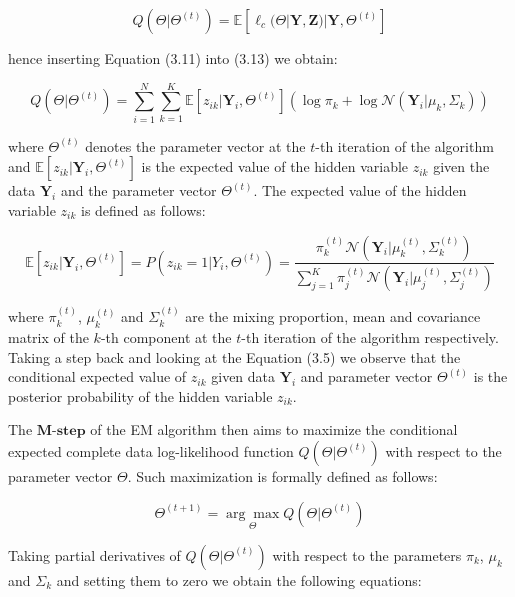 \begin{equation}
    Q(\Theta|\Theta^{(t)}) = \mathbb{E}[\ell_c(\Theta|\textbf{Y},\textbf{Z})|\textbf{Y},\Theta^{(t)}]
\end{equation}

hence inserting Equation (3.11) into (3.13) we obtain:

\begin{equation}
    Q(\Theta|\Theta^{(t)}) = \sum_{i=1}^{N} \sum_{k=1}^{K} \mathbb{E}[z_{ik}|\textbf{Y}_i,\Theta^{(t)}] \left(\log \pi_k + \log \mathcal{N}(\textbf{Y}_i|\mu_k,\Sigma_k)\right)
\end{equation}

where $\Theta^{(t)}$ denotes the parameter vector at the $t$-th iteration of the algorithm and $\mathbb{E}[z_{ik}|\textbf{Y}_i,\Theta^{(t)}]$ is the expected value of the hidden variable $z_{ik}$ given the data $\textbf{Y}_i$ and the parameter vector $\Theta^{(t)}$.
The expected value of the hidden variable $z_{ik}$ is defined as follows:

\begin{equation}
    \mathbb{E}[z_{ik}|\textbf{Y}_i,\Theta^{(t)}] = P(z_{ik} = 1|Y_i,\Theta^{(t)}) = \frac{\pi_k^{(t)} \mathcal{N}(\textbf{Y}_i|\mu_k^{(t)},\Sigma_k^{(t)})}{\sum_{j=1}^{K} \pi_j^{(t)} \mathcal{N}(\textbf{Y}_i|\mu_j^{(t)},\Sigma_j^{(t)})}
\end{equation}

where $\pi_k^{(t)}$, $\mu_k^{(t)}$ and $\Sigma_k^{(t)}$ are the mixing proportion, mean and covariance matrix of the $k$-th component at the $t$-th iteration of the algorithm respectively.
Taking a step back and looking at the Equation (3.5) we observe that the conditional expected value of $z_{ik}$ given data $\textbf{Y}_i$ 
and parameter vector $\Theta^{(t)}$ is the posterior probability of the hidden variable $z_{ik}$.

The $\textbf{M-step}$ of the EM algorithm then aims to maximize the conditional expected complete data log-likelihood function $Q(\Theta|\Theta^{(t)})$ with respect to the parameter vector $\Theta$.
Such maximization is formally defined as follows:

\begin{equation}
    \Theta^{(t+1)} = \underset{\Theta}{\arg\max} Q(\Theta|\Theta^{(t)})
\end{equation}

Taking partial derivatives of $Q(\Theta|\Theta^{(t)})$ with respect to the parameters $\pi_k$, $\mu_k$ and $\Sigma_k$ and setting them to zero we obtain the following equations:

